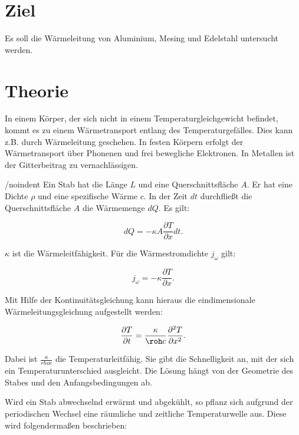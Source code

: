 \section{Ziel}
\label{sec:Ziel}

Es soll die Wärmeleitung von Aluminium, Mesing und Edelstahl untersucht werden. 

\section{Theorie}
\label{sec:Theorie}

In einem Körper, der sich nicht in einem Temperaturgleichgewicht befindet, kommt es zu einem Wärmetransport entlang des Temperaturgefälles. Dies kann z.B. durch Wärmeleitung geschehen. In festen Körpern erfolgt der Wärmetransport über Phonenen und frei bewegliche Elektronen. In Metallen ist der Gitterbeitrag zu vernachlässigen. 

/noindent Ein Stab hat die Länge $L$ und eine Querschnittsfläche $A$. Er hat eine Dichte $\rho$ und eine spezifische Wärme $c$.
In der Zeit $dt$ durchfließt die Querschnittsfläche $A$ die Wärmemenge $dQ$. Es gilt:

\begin{equation}
dQ = -\kappa A \frac{\partial T}{\partial x} dt.
\label{eq:dQ}
\end{equation}

$\kappa$ ist die Wärmeleitfähigkeit. Für die Wärmestromdichte $j_\omega$ gilt:

\begin{equation}
    j_{\omega} = -\kappa \frac{\partial T}{\partial x}.
    \label{eq:jomega}
\end{equation}

Mit Hilfe der Kontinuitätsgleichung kann hieraus die eindimensionale Wärmeleitungsgleichung aufgestellt werden:

\begin{equation}
    \frac{\partial T}{\partial t} = \frac{\kappa}{\roh c} \frac{\partial^2 T}{\partial x^2}.
    \label{eq:warmeleitung}
\end{equation}

Dabei ist $\frac{\kappa}{rho c}$ die Temperaturleitfähig. Sie gibt die Schnelligkeit an, mit der sich ein Temperaturunterschied ausgleicht. Die Lösung hängt von der Geometrie des Stabes und den Anfangsbedingungen ab. 

Wird ein Stab abwechselnd erwärmt und abgekühlt, so pflanz sich aufgrund der periodischen Wechsel  eine räumliche und zeitliche Temperaturwelle aus. Diese wird folgendermaßen beschrieben: 

